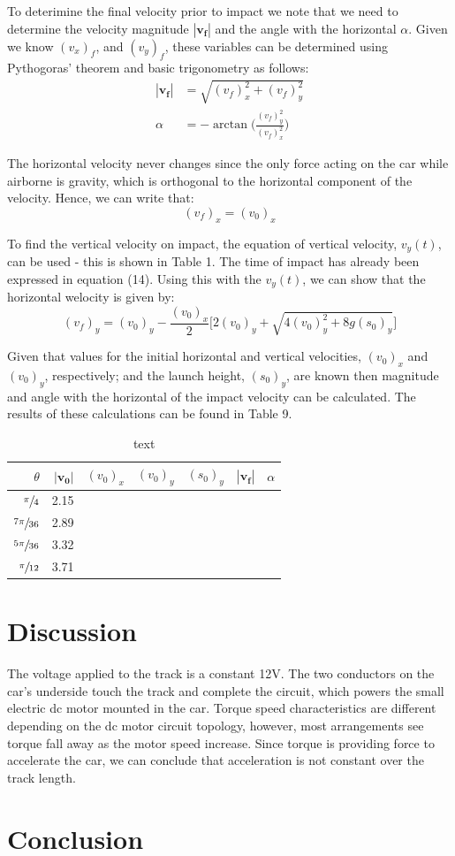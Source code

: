 \documentclass[a4paper]{article}
\begin{document}
To deterimine the final velocity prior to impact we note that we need to determine the velocity magnitude $|\boldsymbol{v_f}|$ and the angle with the horizontal $\alpha$. Given we know $(v_x)_f$, and $(v_y)_f$, these variables can be determined using Pythogoras' theorem and basic trigonometry as follows:
\begin{align}
|\boldsymbol{v_f}| &= \sqrt{(v_f)_x^2 + (v_f)_y^2}\\
\alpha &= -\arctan\bigg(\frac{(v_f)_y^2}{(v_f)_x^2}\bigg)
\end{align} 

The horizontal velocity never changes since the only force acting on the car while airborne is gravity, which is orthogonal to the horizontal component of the velocity. Hence, we can write that:
\begin{equation}
(v_f)_x = (v_0)_x
\end{equation}

To find the vertical velocity on impact, the equation of vertical velocity, $v_y(t)$, can be used - this is shown in Table 1. The time of impact has already been expressed in equation (14). Using this with the $v_y(t)$, we can show that the horizontal welocity is given by:
\begin{equation}
(v_f)_y = (v_0)_y - \frac{(v_0)_x}{2} \bigg[2(v_0)_y + \sqrt{4(v_0)_y^2 + 8g(s_0)_y}\bigg]
\end{equation}

Given that values for the initial horizontal and vertical velocities, $(v_0)_x$ and $(v_0)_y$, respectively; and the launch height, $(s_0)_y$, are known then magnitude and angle with the horizontal of the impact velocity can be calculated. The results of these calculations can be found in Table 9.

\begin{table}[h]
	\centering
	\caption{text}
	\begin{tabular}{rrrrrrr}
		\toprule
		$\theta$ & $|\boldsymbol{v_0}|$ & $(v_0)_x$ & $(v_0)_y$ & $(s_0)_y$ & $|\boldsymbol{v_f}|$ & $\alpha$\\
		\midrule
		$\sfrac{\pi}{4}$ & 2.15 \\
		$\sfrac{7\pi}{36}$ & 2.89 \\
		$\sfrac{5\pi}{36}$ & 3.32 \\
		$\sfrac{\pi}{12}$ & 3.71 \\
		\bottomrule
	\end{tabular}
\end{table}

\section{Discussion}
The voltage applied to the track is a constant 12$\si{\volt}$. The two conductors on the car's underside touch the track and complete the circuit, which powers the small electric dc motor mounted in the car. Torque speed characteristics are different depending on the dc motor circuit topology, however, most arrangements see torque fall away as the motor speed increase. Since torque is providing force to accelerate the car, we can conclude that acceleration is not constant over the track length.

\section{Conclusion}



\end{document}
